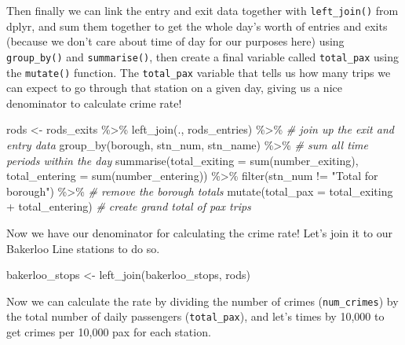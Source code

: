 \documentclass[
  krantz2]{krantz}
\makeatletter
\newenvironment{Shaded}{\begin{snugshade}}{\end{snugshade}}
\newcommand{\AttributeTok}[1]{\textcolor[rgb]{0.61,0.61,0.61}{#1}}
\newcommand{\CommentTok}[1]{\textcolor[rgb]{0.37,0.37,0.37}{\textit{#1}}}
\newcommand{\FunctionTok}[1]{\textcolor[rgb]{0,0,0}{#1}}
\newcommand{\NormalTok}[1]{#1}
\newcommand{\OtherTok}[1]{\textcolor[rgb]{0.37,0.37,0.37}{#1}}
\newcommand{\SpecialCharTok}[1]{\textcolor[rgb]{0,0,0}{#1}}
\newcommand{\StringTok}[1]{\textcolor[rgb]{0.5,0.5,0.5}{#1}}
\newenvironment{kframe}{%
\medskip{}
\setlength{\fboxsep}{.8em}
 \def\at@end@of@kframe{}%
 \ifinner\ifhmode%
  \def\at@end@of@kframe{\end{minipage}}%
  \begin{minipage}{\columnwidth}%
 \fi\fi%
 \def\FrameCommand##1{\hskip\@totalleftmargin \hskip-\fboxsep
 \colorbox{shadecolor}{##1}\hskip-\fboxsep
     \hskip-\linewidth \hskip-\@totalleftmargin \hskip\columnwidth}%
 \MakeFramed {\advance\hsize-\width
   \@totalleftmargin\z@ \linewidth\hsize
   \@setminipage}}%
 {\par\unskip\endMakeFramed%
 \at@end@of@kframe}
\renewenvironment{Shaded}{\begin{kframe}}{\end{kframe}}
\makeatother
\begin{document}
Then finally we can link the entry and exit data together with \texttt{left\_join()} from dplyr, and sum them together to get the whole day's worth of entries and exits (because we don't care about time of day for our purposes here) using \texttt{group\_by()} and \texttt{summarise()}, then create a final variable called \texttt{total\_pax} using the \texttt{mutate()} function. The \texttt{total\_pax} variable that tells us how many trips we can expect to go through that station on a given day, giving us a nice denominator to calculate crime rate!

\begin{Shaded}
\begin{Highlighting}[]
\NormalTok{rods }\OtherTok{\textless{}{-}}\NormalTok{ rods\_exits }\SpecialCharTok{\%\textgreater{}\%}                    
  \FunctionTok{left\_join}\NormalTok{(., rods\_entries) }\SpecialCharTok{\%\textgreater{}\%}                            \CommentTok{\# join up the exit and entry data}
  \FunctionTok{group\_by}\NormalTok{(borough, stn\_num, stn\_name) }\SpecialCharTok{\%\textgreater{}\%}                  \CommentTok{\# sum all time periods within the day}
  \FunctionTok{summarise}\NormalTok{(}\AttributeTok{total\_exiting =} \FunctionTok{sum}\NormalTok{(number\_exiting),}
            \AttributeTok{total\_entering =} \FunctionTok{sum}\NormalTok{(number\_entering)) }\SpecialCharTok{\%\textgreater{}\%} 
  \FunctionTok{filter}\NormalTok{(stn\_num }\SpecialCharTok{!=} \StringTok{"Total for borough"}\NormalTok{) }\SpecialCharTok{\%\textgreater{}\%}               \CommentTok{\# remove the borough totals}
  \FunctionTok{mutate}\NormalTok{(}\AttributeTok{total\_pax =}\NormalTok{ total\_exiting }\SpecialCharTok{+}\NormalTok{ total\_entering)       }\CommentTok{\# create grand total of pax trips}
\end{Highlighting}
\end{Shaded}

Now we have our denominator for calculating the crime rate! Let's join it to our Bakerloo Line stations to do so.

\begin{Shaded}
\begin{Highlighting}[]
\NormalTok{bakerloo\_stops }\OtherTok{\textless{}{-}} \FunctionTok{left\_join}\NormalTok{(bakerloo\_stops, rods)}
\end{Highlighting}
\end{Shaded}

Now we can calculate the rate by dividing the number of crimes (\texttt{num\_crimes}) by the total number of daily passengers (\texttt{total\_pax}), and let's times by 10,000 to get crimes per 10,000 pax for each station.
\end{document}
